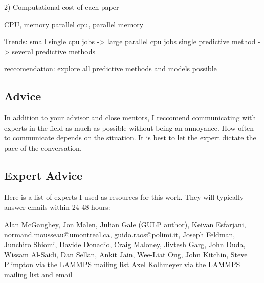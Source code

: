 2) Computational cost of each paper

CPU, memory
parallel cpu, parallel memory

Trends: 
small single cpu jobs -> large parallel cpu jobs
single predictive method -> several predictive methods

reccomendation: explore all predictive methods and models possible

\subsection{Advice}

In addition to your advisor and close mentors, 
I reccomend communicating with experts in the field as much as 
possible without being an annoyance.  How often to 
communicate depends on the situation. 
It is best to let the expert dictate the pace of the conversation. 

\subsection{Expert Advice}

Here is a list of experts I used as resources for this work. They 
will typically answer emails within 24-48 hours:


\href{http://ntpl.me.cmu.edu/people.html}
{Alan McGaughey},
\href{http://www.cmu.edu/me/malen/Lab_Website/People.html}
{Jon Malen},
\href{http://chemistry.curtin.edu.au/people/academic.cfm/J.Gale}
{Julian Gale} 
\href{http://projects.ivec.org/gulp/news.html}
{(GULP author)},
\href{http://mech.rutgers.edu/content/keivan-esfarjani}
{Keivan Esfarjani},
normand.mousseau@umontreal.ca,
guido.raos@polimi.it,
\href{mailto:joseph.feldman.ctr@nrl.navy.mil}
{Joseph Feldman},
\href{http://www.phonon.t.u-tokyo.ac.jp/}
{Junchiro Shiomi},
\href{http://www2.mpip-mainz.mpg.de/~donadio/tnt/People.html}
{Davide Donadio},
\href{http://www.ce.cmu.edu/people/faculty/maloney.html}
{Craig Maloney},
\href{http://quasiamore.mit.edu/pmwiki.php?n=Main.JivteshGarg}
{Jivtesh Garg},
\href{John Duda}
{John Duda},
\href{Wissam Al-Saidi}
{Wissam Al-Saidi},
\href{Dan Sellan}
{Dan Sellan},
\href{Ankit Jain}
{Ankit Jain},
\href{wong@andrew.cmu.edu}
{Wee-Liat Ong},
\href{John Kitchin}
{John Kitchin},
Steve Plimpton via the 
\href{http://lammps.sandia.gov/threads/threads.html}{LAMMPS mailing list} 
Axel Kolhmeyer via the 
\href{http://lammps.sandia.gov/threads/threads.html}{LAMMPS mailing list} 
and \href{akohlmey@gmail.com}{email}

